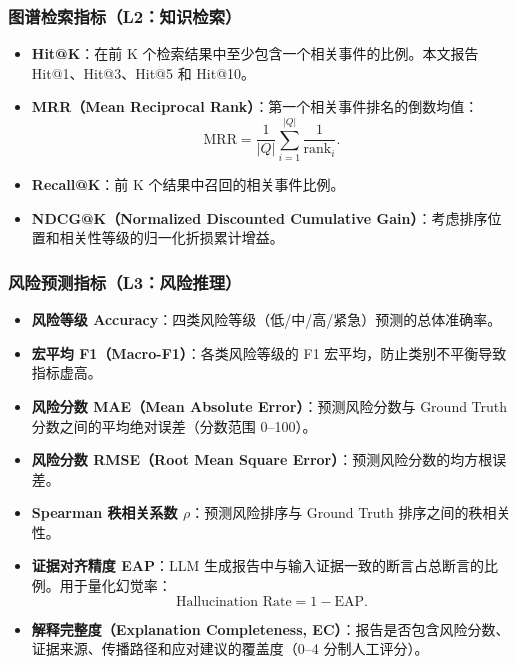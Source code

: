 \documentclass[12pt,a4paper]{article}
\newcommand{\term}[1]{\textbf{#1}}
\begin{document}
\subsubsection{图谱检索指标（L2：知识检索）}

\begin{itemize}
    \item \term{Hit@K}：在前 K 个检索结果中至少包含一个相关事件的比例。本文报告 Hit@1、Hit@3、Hit@5 和 Hit@10。
    \item \term{MRR（Mean Reciprocal Rank）}：第一个相关事件排名的倒数均值：
    \begin{equation}
    \text{MRR} = \frac{1}{|Q|}\sum_{i=1}^{|Q|}\frac{1}{\text{rank}_i}.
    \end{equation}
    \item \term{Recall@K}：前 K 个结果中召回的相关事件比例。
    \item \term{NDCG@K（Normalized Discounted Cumulative Gain）}：考虑排序位置和相关性等级的归一化折损累计增益。
\end{itemize}

\subsubsection{风险预测指标（L3：风险推理）}

\begin{itemize}
    \item \term{风险等级 Accuracy}：四类风险等级（低/中/高/紧急）预测的总体准确率。
    \item \term{宏平均 F1（Macro-F1）}：各类风险等级的 F1 宏平均，防止类别不平衡导致指标虚高。
    \item \term{风险分数 MAE（Mean Absolute Error）}：预测风险分数与 Ground Truth 分数之间的平均绝对误差（分数范围 0--100）。
    \item \term{风险分数 RMSE（Root Mean Square Error）}：预测风险分数的均方根误差。
    \item \term{Spearman 秩相关系数 $\rho$}：预测风险排序与 Ground Truth 排序之间的秩相关性。
    \item \term{证据对齐精度 EAP}：LLM 生成报告中与输入证据一致的断言占总断言的比例。用于量化幻觉率：
    \begin{equation}
    \text{Hallucination Rate} = 1 - \text{EAP}.
    \end{equation}
    \item \term{解释完整度（Explanation Completeness, EC）}：报告是否包含风险分数、证据来源、传播路径和应对建议的覆盖度（0--4 分制人工评分）。
\end{itemize}
\end{document}
